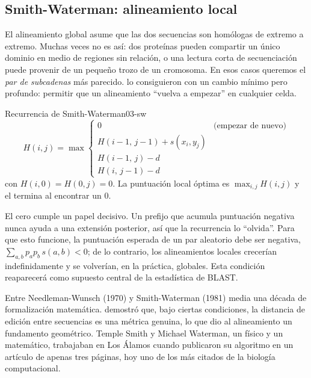 \subsection{Smith-Waterman: alineamiento local}

El alineamiento global asume que las dos secuencias son homólogas de extremo a extremo. Muchas veces no es así: dos proteínas pueden compartir un único dominio en medio de regiones sin relación, o una lectura corta de secuenciación puede provenir de un pequeño trozo de un cromosoma. En esos casos queremos el \emph{par de subcadenas} más parecido. \textcite{c03-smith1981} lo consiguieron con un cambio mínimo pero profundo: permitir que un alineamiento ``vuelva a empezar'' en cualquier celda.

\begin{teorema}{Recurrencia de Smith-Waterman}{03-sw}
\begin{equation}\label{eq:03-sw}
H(i,j) = \max\begin{cases}
0 & \text{(empezar de nuevo)}\\
H(i-1,\,j-1) + s(x_i, y_j)\\
H(i-1,\,j) - d\\
H(i,\,j-1) - d
\end{cases}
\end{equation}
con $H(i,0)=H(0,j)=0$. La puntuación local óptima es $\max_{i,j} H(i,j)$ y el  termina al encontrar un $0$.
\end{teorema}

El cero cumple un papel decisivo. Un prefijo que acumula puntuación negativa nunca ayuda a una extensión posterior, así que la recurrencia lo ``olvida''. Para que esto funcione, la puntuación esperada de un par aleatorio debe ser negativa, $\sum_{a,b} p_a p_b\, s(a,b) < 0$; de lo contrario, los alineamientos locales crecerían indefinidamente y se volverían, en la práctica, globales. Esta condición reaparecerá como supuesto central de la estadística de BLAST.

\begin{historia}
Entre Needleman-Wunsch (1970) y Smith-Waterman (1981) media una década de formalización matemática. \textcite{c03-sellers1974} demostró que, bajo ciertas condiciones, la distancia de edición entre secuencias es una métrica genuina, lo que dio al alineamiento un fundamento geométrico. Temple Smith y Michael Waterman, un físico y un matemático, trabajaban en Los Álamos cuando publicaron su algoritmo en un artículo de apenas tres páginas, hoy uno de los más citados de la biología computacional.
\end{historia}

